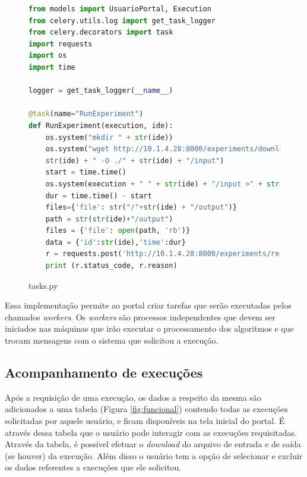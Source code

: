 \documentclass[tg]{mdtufsm}
\begin{document}
\begin{figure}
	\centering
	\begin{minipage}[c]{1\textwidth}
		\begin{lstlisting}[language=Python, frame=single]
from models import UsuarioPortal, Execution
from celery.utils.log import get_task_logger
from celery.decorators import task
import requests
import os
import time

logger = get_task_logger(__name__)

@task(name="RunExperiment")
def RunExperiment(execution, ide):
	os.system("mkdir " + str(ide))
	os.system("wget http://10.1.4.28:8000/experiments/downloadInputFile?id=" +
	str(ide) + " -O ./" + str(ide) + "/input")
	start = time.time()
	os.system(execution + " " + str(ide) + "/input >" + str(ide) + "/output")
	dur = time.time() - start
	files={'file': str("/"+str(ide) + "/output")}
	path = str(str(ide)+"/output")
	files = {'file': open(path, 'rb')}
	data = {'id':str(ide),'time':dur}
	r = requests.post('http://10.1.4.28:8000/experiments/result', files=files,data=data)
	print (r.status_code, r.reason)
		\end{lstlisting}
		\caption{
			tasks.py
		}
		\label{fig:run}
	\end{minipage}
\end{figure}


Essa implementação permite ao portal criar tarefas que serão executadas pelos chamados \emph{workers}. Os \emph{workers} são processos independentes que devem ser iniciados nas máquinas que irão executar o processamento dos algoritmos e que trocam mensagens com o sistema que solicitou a execução.


\subsection{Acompanhamento de execuções}



Após a requisição de uma execução, os dados a respeito da mesma são adicionados a uma tabela (Figura \ref{fig:funcional}) contendo todas as execuções solicitadas por aquele usuário, e ficam disponíveis na tela inicial do portal. É através dessa tabela que o usuário pode interagir com as execuções requisitadas. Através da tabela, é possível efetuar o \emph{download} do arquivo de entrada e de saída (se houver) da execução. Além disso o usuário tem a opção de selecionar e excluir os dados referentes a execuções que ele solicitou.
\end{document}
